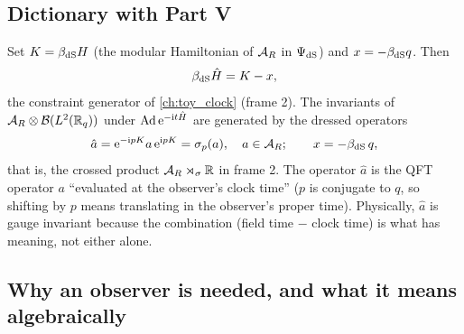 \subsection{Dictionary with Part V}

Set $K=\beta_{\rm dS}H$ (the modular Hamiltonian of $\mathcal{A}_R$ in $\Psi_{\rm dS}$) and $x=-\beta_{\rm dS}q$. Then
\begin{equation}
\beta_{\rm dS}\hat H=K-x,
\end{equation}
the constraint generator of \cref{ch:toy_clock} (frame 2). The invariants of $\mathcal{A}_R\otimes\mathcal{B}(L^2(\mathbb{R}_q))$ under $\operatorname{Ad}\mathrm{e}^{-\mathrm{i} t\hat H}$ are generated by the dressed operators
\begin{equation}
\hat a=\mathrm{e}^{-\mathrm{i} pK}a\,\mathrm{e}^{\mathrm{i} pK}=\sigma_p(a),\quad a\in\mathcal{A}_R;\qquad x=-\beta_{\rm dS}\,q,
\end{equation}
that is, the crossed product $\mathcal{A}_R\rtimes_\sigma\mathbb{R}$ in frame 2. The operator $\hat a$ is the QFT operator $a$ ``evaluated at the observer's clock time'' ($p$ is conjugate to $q$, so shifting by $p$ means translating in the observer's proper time). Physically, $\hat a$ is gauge invariant because the combination (field time $-$ clock time) is what has meaning, not either alone.

\begin{table}[h]
\centering
{}
\end{table}

\subsection{Why an observer is needed, and what it means algebraically}

